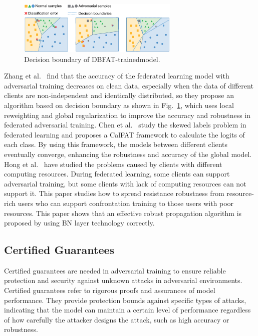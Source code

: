 \documentclass[pdflatex,sn-mathphys-num]{sn-jnl}%
\theoremstyle{thmstyleone}%
\theoremstyle{thmstyletwo}%
\theoremstyle{thmstylethree}%
\begin{document}
\begin{figure}[h]
	\centering
	\includegraphics[width=1.0\linewidth,height=1.0in]{output/fig21.eps}
	\caption{Decision boundary of DBFAT-trainedmodel.}
	\label{fig21}
\end{figure}


Zhang et al.~\cite{zhang2023delving} find that the accuracy of the federated
learning model with adversarial training decreases on
clean data, especially when the data of different clients
are non-independent and identically distributed, so they
propose an algorithm based on decision boundary as
shown in Fig.~\ref{fig21}, which uses local reweighting and global
regularization to improve the accuracy and robustness in
federated adversarial training. Chen et al.~\cite{chen2022calfat} study the
skewed labels problem in federated learning and proposes
a CalFAT framework to calculate the logits of each class.
By using this framework, the models between different
clients eventually converge, enhancing the robustness and
accuracy of the global model.
Hong et al.~\cite{hong2021federated} have studied the problems caused
by clients with different computing resources. During
federated learning, some clients can support adversarial
training, but some clients with lack of computing resources
can not support it. This paper studies how to spread
resistance robustness from resource-rich users who can
support confrontation training to those users with poor
resources. This paper shows that an effective robust
propagation algorithm is proposed by using BN layer
technology correctly.

\subsection{Certified Guarantees}
Certified guarantees are needed in adversarial training
to ensure reliable protection and security against unknown
attacks in adversarial environments. Certified guarantees
refer to rigorous proofs and assurances of model
performance. They provide protection bounds against specific
types of attacks, indicating that the model can maintain
a certain level of performance regardless of how carefully
the attacker designs the attack, such as high accuracy or
robustness.
\end{document}
